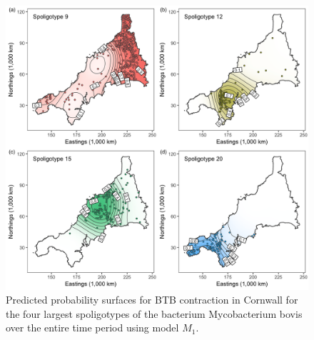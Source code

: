 \documentclass[a4paper,showframe,11pt]{report}\usepackage[]{graphicx}\usepackage[]{color}
\newenvironment{knitrout}{}{} %
\begin{document}
\begin{knitrout}
\color{fgcolor}\begin{figure}[p]

{\centering \includegraphics[width=\linewidth]{figure/05-plot_btb-1} 

}

\caption[Predicted probability surfaces for BTB contraction in Cornwall for the four largest spoligotypes of the bacterium Mycobacterium bovis over the entire time period using model $M_1$]{Predicted probability surfaces for BTB contraction in Cornwall for the four largest spoligotypes of the bacterium Mycobacterium bovis over the entire time period using model $M_1$.}\label{fig:plot.btb}
\end{figure}


\end{knitrout}
\end{document}
